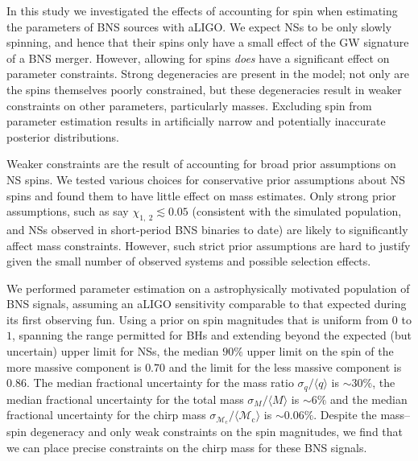 In this study we investigated the effects of accounting for spin when estimating the parameters of BNS sources with aLIGO. We expect NSs to be only slowly spinning, and hence that their spins only have a small effect of the GW signature of a BNS merger. However, allowing for spins \textit{does} have a significant effect on parameter constraints. Strong degeneracies are present in the model; not only are the spins themselves poorly constrained, but these degeneracies result in weaker constraints on other parameters, particularly masses.  Excluding spin from parameter estimation results in artificially narrow and potentially inaccurate posterior distributions.

Weaker constraints are the result of accounting for broad prior assumptions on NS spins.  We tested various choices for conservative prior assumptions about NS spins and found them to have little effect on mass estimates.  Only strong prior assumptions, such as say $\chi_{1,~2}\lesssim 0.05$ (consistent with the simulated population, and NSs observed in short-period BNS binaries to date) are likely to significantly affect mass constraints.  However, such strict prior assumptions are hard to justify given the small number of observed systems and possible selection effects.

We performed parameter estimation on a astrophysically motivated population of BNS signals, assuming an aLIGO sensitivity comparable to that expected during its first observing fun. Using a prior on spin magnitudes that is uniform from $0$ to $1$, spanning the range permitted for BHs and extending beyond the expected (but uncertain) upper limit for NSs, the median $90\%$ upper limit on the spin of the more massive component is $0.70$ and the limit for the less massive component is $0.86$. The median fractional uncertainty for the mass ratio $\sigma_q/\langle q \rangle$ is $\sim30\%$, the median fractional uncertainty for the total mass $\sigma_{{M}}/\langle {M} \rangle$ is $\sim6\%$ and the median fractional uncertainty for the chirp mass $\sigma_{\mathcal{M}_\mathrm{c}}/\langle {\mathcal{M}_\mathrm{c}} \rangle$ is $\sim0.06\%$. Despite the mass--spin degeneracy and only weak constraints on the spin magnitudes, we find that we can place precise constraints on the chirp mass for these BNS signals.

